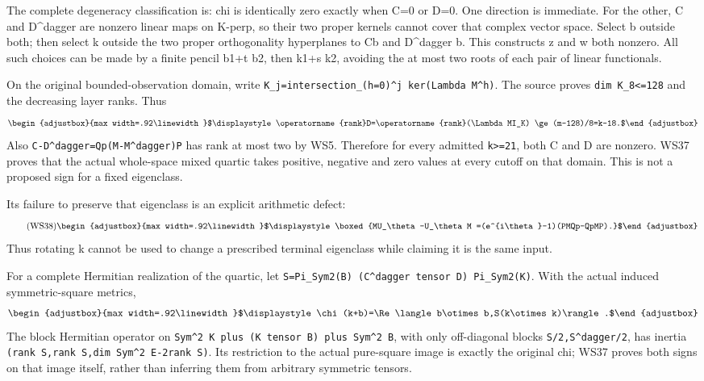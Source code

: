 \documentclass[11pt]{article}
\begin{document}
The complete degeneracy classification is: chi is identically zero exactly when C=0 or D=0. One direction is immediate. For the other, C and D\^{}dagger are nonzero linear maps on K-perp, so their two proper kernels cannot cover that complex vector space. Select b outside both; then select k outside the two proper orthogonality hyperplanes to Cb and D\^{}dagger b. This constructs z and w both nonzero. All such choices can be made by a finite pencil b1+t b2, then k1+s k2, avoiding the at most two roots of each pair of linear functionals.

On the original bounded-observation domain, write \texttt{K\_\allowbreak{}j=\allowbreak{}intersection\_\allowbreak{}(h=\allowbreak{}0)\^{}j ker(Lambda M\^{}h)}. The source proves \texttt{dim K\_\allowbreak{}8\textless{}=\allowbreak{}128} and the decreasing layer ranks. Thus 
\begin{equation*}
\begin{adjustbox}{max width=.92\linewidth}$\displaystyle \operatorname{rank}D=\operatorname{rank}(\Lambda MI_K)
 \ge(m-128)/8=k-18.$\end{adjustbox}
\end{equation*}
 Also \texttt{C-D\^{}dagger=\allowbreak{}Qp(M-M\^{}dagger)P} has rank at most two by WS5. Therefore for every admitted \texttt{k\textgreater{}=\allowbreak{}21}, both C and D are nonzero. WS37 proves that the actual whole-space mixed quartic takes positive, negative and zero values at every cutoff on that domain. This is not a proposed sign for a fixed eigenclass.

Its failure to preserve that eigenclass is an explicit arithmetic defect: 
\begin{equation*}
\tag{WS38}
\begin{adjustbox}{max width=.92\linewidth}$\displaystyle \boxed{MU_\theta-U_\theta M
 =(e^{i\theta}-1)(PMQp-QpMP).}$\end{adjustbox}
\end{equation*}
 Thus rotating k cannot be used to change a prescribed terminal eigenclass while claiming it is the same input.

For a complete Hermitian realization of the quartic, let \texttt{S=\allowbreak{}Pi\_\allowbreak{}Sym2(B) (C\^{}dagger tensor D) Pi\_\allowbreak{}Sym2(K)}. With the actual induced symmetric-square metrics, 
\begin{equation*}
\begin{adjustbox}{max width=.92\linewidth}$\displaystyle \chi(k+b)=\Re\langle b\otimes b,S(k\otimes k)\rangle.$\end{adjustbox}
\end{equation*}
 The block Hermitian operator on \texttt{Sym\^{}2 K plus (K tensor B) plus Sym\^{}2 B}, with only off-diagonal blocks \texttt{S/\allowbreak{}2,\allowbreak{}S\^{}dagger/\allowbreak{}2}, has inertia \texttt{(rank S,\allowbreak{}rank S,\allowbreak{}dim Sym\^{}2 E-2rank S)}. Its restriction to the actual pure-square image is exactly the original chi; WS37 proves both signs on that image itself, rather than inferring them from arbitrary symmetric tensors.
\end{document}
